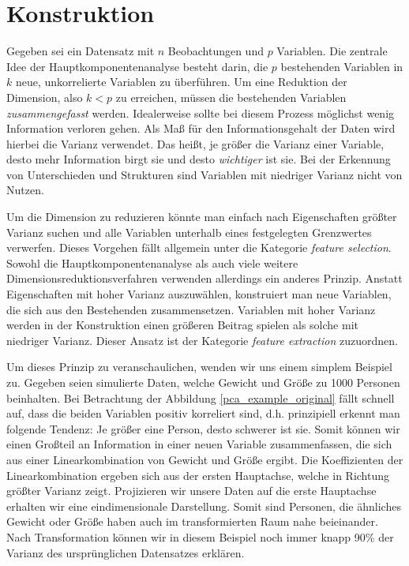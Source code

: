 \section{Konstruktion}

Gegeben sei ein Datensatz mit $n$ Beobachtungen und $p$ Variablen. Die zentrale Idee der Hauptkomponentenanalyse besteht darin, die $p$ bestehenden Variablen in $k$ neue, unkorrelierte Variablen zu überführen. Um eine Reduktion der Dimension, also $k < p$ zu erreichen, müssen die bestehenden Variablen \textit{zusammengefasst} werden. Idealerweise sollte bei diesem Prozess möglichst wenig Information verloren gehen. Als Maß für den Informationsgehalt der Daten wird hierbei die Varianz verwendet. Das heißt, je größer die Varianz einer Variable, desto mehr Information birgt sie und desto \textit{wichtiger} ist sie. Bei der Erkennung von Unterschieden und Strukturen sind Variablen mit niedriger Varianz nicht von Nutzen. 

Um die Dimension zu reduzieren könnte man einfach nach Eigenschaften größter Varianz suchen und alle Variablen unterhalb eines festgelegten Grenzwertes verwerfen. Dieses Vorgehen fällt allgemein unter die Kategorie \textit{feature selection}. Sowohl die Hauptkomponentenanalyse als auch viele weitere Dimensionsreduktionsverfahren verwenden allerdings ein anderes Prinzip. Anstatt Eigenschaften mit hoher Varianz auszuwählen, konstruiert man neue Variablen, die sich aus den Bestehenden zusammensetzen. Variablen mit hoher Varianz werden in der Konstruktion einen größeren Beitrag spielen als solche mit niedriger Varianz. Dieser Ansatz ist der Kategorie \textit{feature extraction} zuzuordnen.

Um dieses Prinzip zu veranschaulichen, wenden wir uns einem simplem Beispiel zu. Gegeben seien simulierte Daten, welche Gewicht und Größe zu 1000 Personen beinhalten. Bei Betrachtung der Abbildung \ref{pca_example_original} fällt schnell auf, dass die beiden Variablen positiv korreliert sind, d.h. prinzipiell erkennt man folgende Tendenz: Je größer eine Person, desto schwerer ist sie. Somit können wir einen Großteil an Information in einer neuen Variable zusammenfassen, die sich aus einer Linearkombination von Gewicht und Größe ergibt. Die Koeffizienten der Linearkombination ergeben sich aus der ersten Hauptachse, welche in Richtung größter Varianz zeigt. Projizieren wir unsere Daten auf die erste Hauptachse erhalten wir eine eindimensionale Darstellung. Somit sind Personen, die ähnliches Gewicht oder Größe haben auch im transformierten Raum nahe beieinander. Nach Transformation können wir in diesem Beispiel noch immer knapp 90\% der Varianz des ursprünglichen Datensatzes erklären.\\

